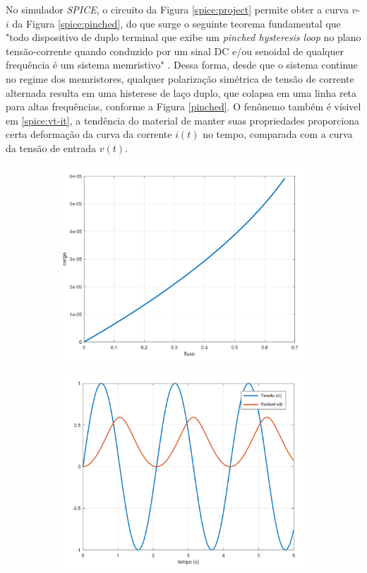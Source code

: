 \documentclass{ceel}
\begin{document}
\begin{multicols}{2}
No simulador \emph{SPICE}, o circuito da Figura \ref{spice:project} permite obter a curva $v$-$i$ da Figura \ref{spice:pinched}, do que surge o seguinte teorema fundamental que "todo dispositivo de duplo terminal que exibe um \emph{pinched hysteresis loop} no plano tensão-corrente quando conduzido por um sinal DC e/ou senoidal de qualquer frequência é um sistema memristivo"  \cite{you}. Dessa forma, desde que o sistema continue no regime dos memristores, qualquer polarização simétrica de tensão de corrente alternada resulta em uma histerese de laço duplo, que colapsa em uma linha reta para altas frequências, conforme a Figura \ref{pinched}. O fenônemo também é vísivel em \ref{spice:vt-it}, a tendência do material de manter suas propriedades proporciona certa deformação da curva da corrente $i(t)$ no tempo, comparada com a curva da tensão de entrada $v(t)$.
\begin{figure}[ht]
\begin{subfigure}{0.33\textwidth}
\includegraphics[width=\columnwidth]{flux-charge}
\caption{} \label{flux-charge}
\end{subfigure}
\hfill
\begin{subfigure}{0.33\textwidth}
\includegraphics[width=\columnwidth]{vt-xt}

\end{subfigure}
\end{figure}
\end{multicols}
\end{document}
